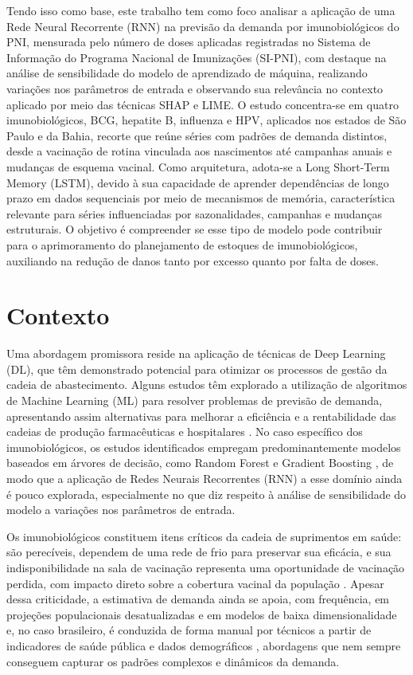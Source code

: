 \documentclass[
    12pt,                %
    openright,           %
    oneside,             %
    a4paper,             %
    english,             %
    brazil               %
]{abntex2}
\begin{document}
Tendo isso como base, este trabalho tem como foco analisar a aplicação de uma Rede Neural Recorrente (RNN) na previsão da demanda por imunobiológicos do PNI, mensurada pelo número de doses aplicadas registradas no Sistema de Informação do Programa Nacional de Imunizações (SI-PNI), com destaque na análise de sensibilidade do modelo de aprendizado de máquina, realizando variações nos parâmetros de entrada e observando sua relevância no contexto aplicado por meio das técnicas SHAP e LIME. O estudo concentra-se em quatro imunobiológicos, BCG, hepatite B, influenza e HPV, aplicados nos estados de São Paulo e da Bahia, recorte que reúne séries com padrões de demanda distintos, desde a vacinação de rotina vinculada aos nascimentos até campanhas anuais e mudanças de esquema vacinal. Como arquitetura, adota-se a Long Short-Term Memory (LSTM), devido à sua capacidade de aprender dependências de longo prazo em dados sequenciais por meio de mecanismos de memória, característica relevante para séries influenciadas por sazonalidades, campanhas e mudanças estruturais. O objetivo é compreender se esse tipo de modelo pode contribuir para o aprimoramento do planejamento de estoques de imunobiológicos, auxiliando na redução de danos tanto por excesso quanto por falta de doses.

\section{Contexto}
\label{sec:contexto}

Uma abordagem promissora reside na aplicação de técnicas de Deep Learning (DL), que têm demonstrado potencial para otimizar os processos de gestão da cadeia de abastecimento. Alguns estudos têm explorado a utilização de algoritmos de Machine Learning (ML) para resolver problemas de previsão de demanda, apresentando assim alternativas para melhorar a eficiência e a rentabilidade das cadeias de produção farmacêuticas e hospitalares . No caso específico dos imunobiológicos, os estudos identificados empregam predominantemente modelos baseados em árvores de decisão, como Random Forest e Gradient Boosting \cite{Hariharan2020,Lopes2022}, de modo que a aplicação de Redes Neurais Recorrentes (RNN) a esse domínio ainda é pouco explorada, especialmente no que diz respeito à análise de sensibilidade do modelo a variações nos parâmetros de entrada.

Os imunobiológicos constituem itens críticos da cadeia de suprimentos em saúde: são perecíveis, dependem de uma rede de frio para preservar sua eficácia, e sua indisponibilidade na sala de vacinação representa uma oportunidade de vacinação perdida, com impacto direto sobre a cobertura vacinal da população \cite{Lopes2022,Hariharan2020}. Apesar dessa criticidade, a estimativa de demanda ainda se apoia, com frequência, em projeções populacionais desatualizadas e em modelos de baixa dimensionalidade \cite{Hariharan2020} e, no caso brasileiro, é conduzida de forma manual por técnicos a partir de indicadores de saúde pública e dados demográficos \cite{Lopes2022}, abordagens que nem sempre conseguem capturar os padrões complexos e dinâmicos da demanda.
\end{document}

